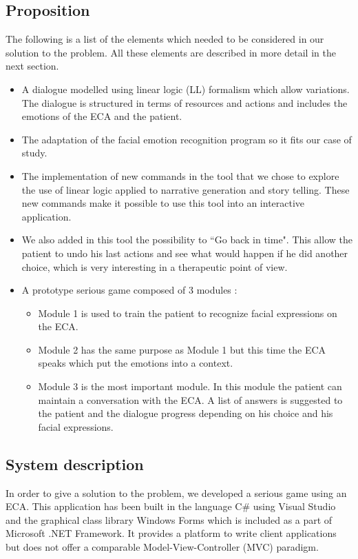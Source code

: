 \documentclass[11pt]{article}
\begin{document}
\subsection{Proposition}
The following is a list of the elements which needed to be considered in our solution to the problem. All these elements are described in more detail in the next section.
\begin{itemize}[noitemsep]
\item A dialogue modelled using linear logic (LL) formalism which allow variations. The dialogue is structured in terms of resources and actions and includes the emotions of the ECA and the patient.
\item The adaptation of the facial emotion recognition program so it fits our case of study.
\item The implementation of new commands in the tool that we chose to explore the use of linear logic applied to narrative generation and story telling. These new commands make it possible to use this tool into an interactive application.
\item We also added in this tool the possibility to ``Go back in time". This allow the patient to undo his last actions and see what would happen if he did another choice, which is very interesting in a therapeutic point of view.
\item A prototype serious game composed of 3 modules :
\begin{itemize}
\item Module 1 is used to train the patient to recognize facial expressions on the ECA.
\item Module 2 has the same purpose as Module 1 but this time the ECA speaks which put the emotions into a context.
\item Module 3 is the most important module. In this module the patient can maintain a conversation with the ECA. A list of answers is suggested to the patient and the dialogue progress depending on his choice and his facial expressions.
\end{itemize}
\end{itemize}
\subsection{System description}
In order to give a solution to the problem, we developed a serious game using an ECA. This application has been built in the language C\# using Visual Studio and the graphical class library Windows Forms which is included as a part of Microsoft .NET Framework. It provides a platform to write client applications but does not offer a comparable Model-View-Controller (MVC) paradigm. \\
\end{document}
